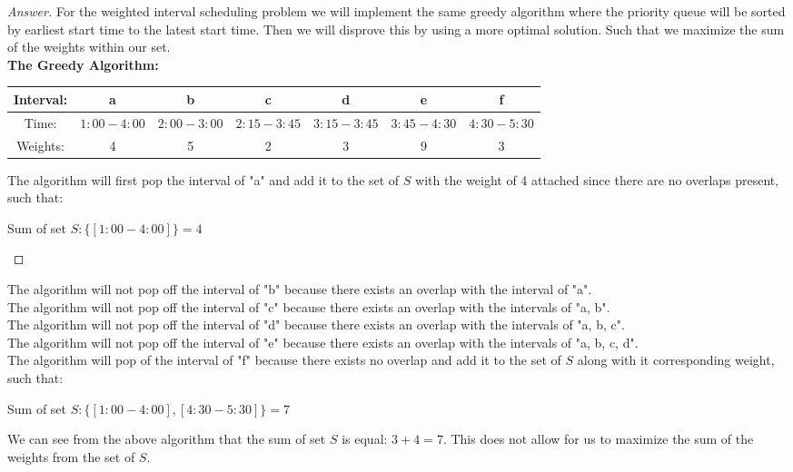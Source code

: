 \documentclass[11pt]{article}
\theoremstyle{definition}
\theoremstyle{definition}
\theoremstyle{definition}
\begin{document}
\begin{proof}[Answer]
For the weighted interval scheduling problem we will implement the same greedy algorithm where the priority queue will be sorted by earliest start time to the latest start time. Then we will disprove this by using a more optimal solution. Such that we maximize the sum of the weights within our set. \\
\textbf{The Greedy Algorithm:}\\
\begin{center}
\begin{tabular}{ | c | c | c | c | c | c | c | }
 \hline
 Interval:& a & b & c & d & e & f\\  
 \hline
 Time: & $1:00 - 4:00$ & $2:00 - 3:00$ & $2:15 - 3:45$ & $3:15 - 3:45$ & $3:45 - 4:30$ & $4:30 - 5:30$\\
  \hline
  Weights: & 4 & 5 & 2 & 3 & 9 & 3 \\
  \hline
\end{tabular}
\end{center}
The algorithm will first pop the interval of "a" and add it to the set of $S$ with the weight of 4 attached since there are no overlaps present, such that: \\
\begin{center}
Sum of set $S: \{[1:00 - 4: 00]\} = 4$\\
\end{center}
\end{proof}

The algorithm will not pop off the interval of "b" because there exists an overlap with the interval of "a". \\
The algorithm will not pop off the interval of "c" because there exists an overlap with the intervals of "a, b". \\
The algorithm will not pop off the interval of "d" because there exists an overlap with the intervals of "a, b, c". \\
The algorithm will not pop off the interval of "e" because there exists an overlap with the intervals of "a, b, c, d". \\

The algorithm will pop of the interval of "f" because there exists no overlap and add it to the set of $S$ along with it corresponding weight, such that: \\
\begin{center}
Sum of set $S: \{[1:00 - 4: 00], [4:30 - 5:30]\} = 7$\\
\end{center}
We can see from the above algorithm that the sum of set $S$ is equal: $3 + 4 = 7$. This does not allow for us to maximize the sum of the weights from the set of $S$. \\
\end{document}
